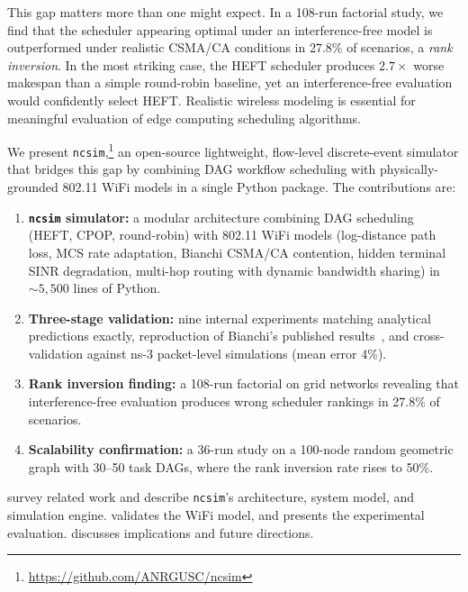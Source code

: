 \documentclass[conference]{IEEEtran}
\newcommand{\ncsim}{\texttt{ncsim}}
\begin{document}
This gap matters more than one might expect.  In a 108-run factorial
study, we find that the scheduler appearing optimal under an
interference-free model is outperformed under realistic CSMA/CA
conditions in 27.8\% of scenarios, a \emph{rank inversion}.  In the
most striking case, the HEFT scheduler produces $2.7\times$ worse makespan
than a simple round-robin baseline, yet an interference-free evaluation
would confidently select HEFT.  Realistic wireless modeling is essential
for meaningful evaluation of edge computing scheduling algorithms.

We present \ncsim{},\footnote{\url{https://github.com/ANRGUSC/ncsim}}
an open-source lightweight, flow-level discrete-event simulator that bridges this gap
by combining DAG workflow scheduling with physically-grounded 802.11
WiFi models in a single Python package.  The contributions are:

\begin{enumerate}[itemsep=2pt,leftmargin=*]
\item \textbf{\ncsim{} simulator:} a modular architecture combining DAG
  scheduling (HEFT, CPOP, round-robin) with 802.11 WiFi models
  (log-distance path loss, MCS rate adaptation, Bianchi CSMA/CA
  contention, hidden terminal SINR degradation, multi-hop routing with
  dynamic bandwidth sharing) in ${\sim}5{,}500$ lines of Python.
\item \textbf{Three-stage validation:} nine internal experiments matching
  analytical predictions exactly, reproduction of Bianchi's published
  results~\cite{bianchi2000}, and cross-validation against ns-3
  packet-level simulations (mean error 4\%).
\item \textbf{Rank inversion finding:} a 108-run factorial on grid networks
  revealing that interference-free evaluation produces wrong scheduler
  rankings in 27.8\% of scenarios.
\item \textbf{Scalability confirmation:} a 36-run study on a 100-node
  random geometric graph with 30--50 task DAGs, where the rank inversion
  rate rises to 50\%.
\end{enumerate}

 survey related work and
describe \ncsim{}'s architecture, system model, and simulation engine.
 validates the WiFi model, and 
presents the experimental evaluation.   discusses
implications and future directions.


\end{document}
